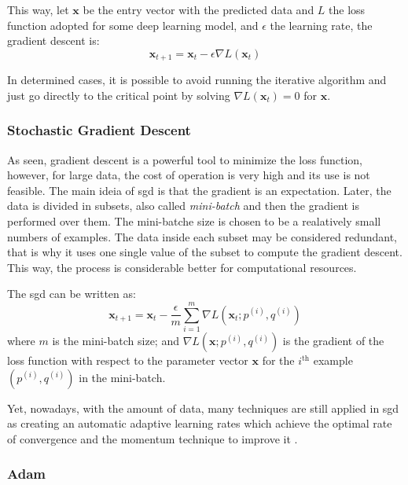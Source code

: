 This way, let \(\symbf{x}\) be the entry vector with the predicted data and \(L\) the loss function adopted for some deep learning model, and \(\epsilon\) the learning rate, the gradient descent is:
%
\begin{equation}
    \symbf{x}_{t+1} = \symbf{x}_t - \epsilon \nabla L(\symbf{x}_t)
\end{equation}

In determined cases, it is possible to avoid running the iterative algorithm and just go directly to the critical point by solving \(\nabla L(\symbf{x}_t) = 0\) for \(\symbf{x}\).

\subsubsection*{Stochastic Gradient Descent}

As seen, gradient descent is a powerful tool to minimize the loss function, however, for large data, the cost of operation is very high and its use is not feasible. 
The main ideia of \gls*{sgd} is that the gradient is an expectation.
Later, the data is divided in subsets, also called \emph{mini-batch} and then the gradient is performed over them.
The mini-batche size is chosen to be a realatively small numbers of examples.
The data inside each subset may be considered redundant, that is why it uses one single value of the subset to compute the gradient descent.
This way, the process is considerable better for computational resources.

The \gls*{sgd} can be written as:
%
\begin{equation}
    \symbf{x}_{t+1} = \symbf{x}_t - \frac{\epsilon}{m} \sum_{i=1}^m \nabla L(\symbf{x}_t; p^{(i)},q^{(i)})
\end{equation}
%
where \(m\)  is the mini-batch size; and \(\nabla L(\symbf{x}; p^{(i)}, q^{(i)})\) is the gradient of the loss function with respect to the parameter vector \(\symbf{x}\) for the \(i^{\text{th}}\) example \((p^{(i)}, q^{(i)})\) in the mini-batch.

Yet, nowadays, with the amount of data, many techniques are still applied in \gls*{sgd} as creating an automatic adaptive learning rates which achieve the optimal rate of convergence \citep{darken1991} and the momentum technique to improve it \citep{sutskever2013}.

\subsubsection*{Adam}

